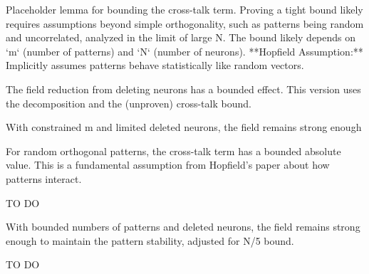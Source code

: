 \begin{lemma}\label{bound_cross_talk_term}
Placeholder lemma for bounding the cross-talk term.
Proving a tight bound likely requires assumptions beyond simple orthogonality,
such as patterns being random and uncorrelated, analyzed in the limit of large N.
The bound likely depends on `m` (number of patterns) and `N` (number of neurons).
**Hopfield Assumption:** Implicitly assumes patterns behave statistically like random vectors.
\end{lemma}

\begin{lemma}\label{deleted_field_bound}
The field reduction from deleting neurons has a bounded effect.
This version uses the decomposition and the (unproven) cross-talk bound.
\end{lemma}

\begin{lemma}\label{field_remains_sufficient}
\leanok
With constrained m and limited deleted neurons, the field remains strong enough
\end{lemma}

\begin{lemma}\label{bound_cross_talk_term_abs}
\leanok
For random orthogonal patterns, the cross-talk term has a bounded absolute value.
This is a fundamental assumption from Hopfield's paper about how patterns interact.
\end{lemma}

\begin{lemma}\label{deleted_field_product_bound}
TO DO
\end{lemma}

\begin{lemma}\label{field_remains_sufficient_for_N_div_5}
With bounded numbers of patterns and deleted neurons, the field remains strong enough
    to maintain the pattern stability, adjusted for N/5 bound.
\end{lemma}

\begin{lemma}\label{hebbian_deleted_threshold_is_zero}
\notready
TO DO
\end{lemma}

